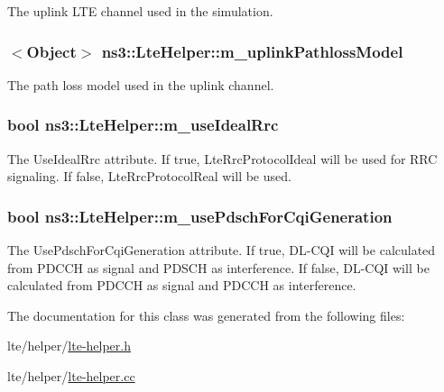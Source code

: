The uplink L\+TE channel used in the simulation. 

\subsubsection[{\texorpdfstring{m\+\_\+uplink\+Pathloss\+Model}{m_uplinkPathlossModel}}]{$<${\bf Object}$>$ ns3\+::\+Lte\+Helper\+::m\+\_\+uplink\+Pathloss\+Model\hspace{0.3cm}{\ttfamily [private]}}\hypertarget{classns3_1_1LteHelper_a0b121aecc2a13aab12908c8547ba336b}{}\label{classns3_1_1LteHelper_a0b121aecc2a13aab12908c8547ba336b}


The path loss model used in the uplink channel. 

\subsubsection[{\texorpdfstring{m\+\_\+use\+Ideal\+Rrc}{m_useIdealRrc}}]{\setlength{\rightskip}{0pt plus 5cm}bool ns3\+::\+Lte\+Helper\+::m\+\_\+use\+Ideal\+Rrc\hspace{0.3cm}{\ttfamily [private]}}\hypertarget{classns3_1_1LteHelper_ab230ddf0db292c4ea6482e80bac0d53a}{}\label{classns3_1_1LteHelper_ab230ddf0db292c4ea6482e80bac0d53a}
The {\ttfamily Use\+Ideal\+Rrc} attribute. If true, Lte\+Rrc\+Protocol\+Ideal will be used for R\+RC signaling. If false, Lte\+Rrc\+Protocol\+Real will be used. 
\subsubsection[{\texorpdfstring{m\+\_\+use\+Pdsch\+For\+Cqi\+Generation}{m_usePdschForCqiGeneration}}]{\setlength{\rightskip}{0pt plus 5cm}bool ns3\+::\+Lte\+Helper\+::m\+\_\+use\+Pdsch\+For\+Cqi\+Generation\hspace{0.3cm}{\ttfamily [private]}}\hypertarget{classns3_1_1LteHelper_abbc3c36de95dcca35d9516c7882104f6}{}\label{classns3_1_1LteHelper_abbc3c36de95dcca35d9516c7882104f6}
The {\ttfamily Use\+Pdsch\+For\+Cqi\+Generation} attribute. If true, D\+L-\/\+C\+QI will be calculated from P\+D\+C\+CH as signal and P\+D\+S\+CH as interference. If false, D\+L-\/\+C\+QI will be calculated from P\+D\+C\+CH as signal and P\+D\+C\+CH as interference. 

The documentation for this class was generated from the following files\+:\begin{DoxyCompactItemize}
\item 
lte/helper/\hyperlink{lte-helper_8h}{lte-\/helper.\+h}\item 
lte/helper/\hyperlink{lte-helper_8cc}{lte-\/helper.\+cc}\end{DoxyCompactItemize}
